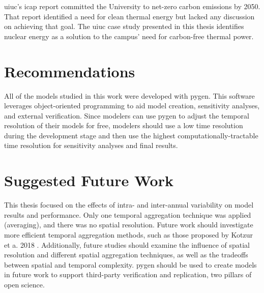 \gls{uiuc}'s \gls{icap} report committed the University to net-zero carbon emissions
by 2050. That report identified a need for clean thermal energy but lacked any
discussion on achieving that goal. The \gls{uiuc} case study presented
in this thesis identifies nuclear energy as a solution to the campus' need for
carbon-free thermal power.

\section{Recommendations}

All of the models studied in this work were developed with \gls{pygen}. This
software leverages object-oriented programming to aid model creation, sensitivity
analyses, and external verification. Since modelers can use \gls{pygen} to adjust
the temporal resolution of their models for free, modelers should use a
low time resolution during the development stage and then use the highest
computationally-tractable time resolution for sensitivity analyses and final
results.

\section{Suggested Future Work}

This thesis focused on the effects of intra- and inter-annual variability on model
results and performance. Only one temporal aggregation technique was applied (averaging),
and there was no spatial resolution. Future work should investigate more efficient
temporal aggregation methods, such as those proposed by Kotzur et a. 2018
\cite{kotzur_impact_2018}. Additionally, future studies should examine the influence
of spatial resolution and different spatial aggregation techniques, as well as
the tradeoffs between spatial and temporal complexity. \gls{pygen} should be used
to create models in future work to support third-party verification and replication,
two pillars of open science.
